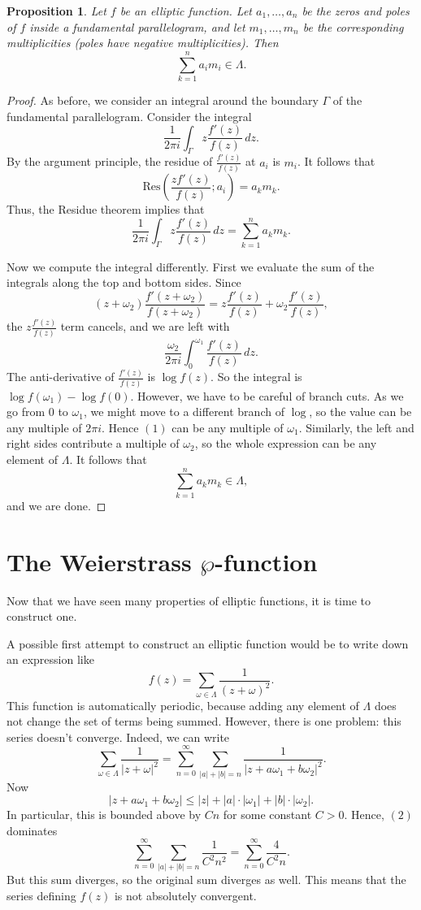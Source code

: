 \documentclass[12pt,reqno]{amsart}
\theoremstyle{plain}
\newtheorem{prop}[thm]{Proposition}
\numberwithin{equation}{section}
\begin{document}
\begin{prop}\label{prop: sum of roots}
Let $f$ be an elliptic function. Let $a_1,\dots, a_n$ be the zeros and poles of $f$ inside a fundamental parallelogram, and let $m_1,\dots, m_n$ be the corresponding multiplicities (poles have negative multiplicities). Then
\[\sum_{k=1}^n a_im_i \in \Lambda.\]
\end{prop}
\begin{proof}
    As before, we consider an integral around the boundary $\Gamma$ of the fundamental parallelogram. Consider the integral
\[\frac{1}{2\pi i}\int_\Gamma z\frac{f'(z)}{f(z)}\, dz.\]
By the argument principle, the residue of $\frac{f'(z)}{f(z)}$ at $a_i$ is $m_i$. It follows that \[\mathrm{Res}\left(\frac{zf'(z)}{f(z)}; a_i\right)=a_km_k.\] Thus, the Residue theorem implies that \[\frac{1}{2\pi i}\int_\Gamma z\frac{f'(z)}{f(z)}\, dz = \sum_{k=1}^n a_km_k.\]

Now we compute the integral differently. First we evaluate the sum of the integrals along the top and bottom sides. Since
\[(z+\omega_2) \frac{f'(z+\omega_2)}{f(z+\omega_2)}= z\frac{f'(z)}{f(z)}+\omega_2\frac{f'(z)}{f(z)},\]
the $z\frac{f'(z)}{f(z)}$ term cancels, and we are left with
\[\frac{\omega_2}{2\pi i}\int_{0}^{\omega_1} \frac{f'(z)}{f(z)}\, dz.\tag{$1$}\]
The anti-derivative of $\frac{f'(z)}{f(z)}$ is $\log f(z)$. So the integral is $\log f(\omega_1) - \log f(0)$. However, we have to be careful of branch cuts. As we go from $0$ to $\omega_1$, we might move to a different branch of $\log$, so the value can be any multiple of $2 \pi i$. Hence $(1)$ can be any multiple of $\omega_1$. Similarly, the left and right sides contribute a multiple of $\omega_2$, so the whole expression can be any element of $\Lambda$. It follows that
\[\sum_{k=1}^n a_k m_k \in \Lambda,\]and we are done.
\end{proof}

\section{The Weierstrass $\wp$-function}
Now that we have seen many properties of elliptic functions, it is time to construct one.

A possible first attempt to construct an elliptic function would be to write down an expression like
\[f(z) = \sum_{\omega\in \Lambda} \frac{1}{(z+\omega)^2}.\]
This function is automatically periodic, because adding any element of $\Lambda$ does not change the set of terms being summed. However, there is one problem: this series doesn't converge. Indeed, we can write 
\[\sum_{\omega\in \Lambda} \frac{1}{|z+\omega|^2} = \sum_{n=0}^\infty \sum_{|a|+|b| = n} \frac{1}{|z + a\omega_1 + b\omega_2|^2}.\tag{$2$}\]
Now 
\[|z+a\omega_1 + b\omega_2| \le |z| + |a|\cdot |\omega_1| + |b| \cdot |\omega_2|.\]
In particular, this is bounded above by $Cn$ for some constant $C>0$. Hence, $(2)$ dominates
\[\sum_{n=0}^\infty \sum_{|a| + |b| = n}\frac{1}{C^2n^2} = \sum_{n=0}^\infty \frac{4}{C^2n}.\]
But this sum diverges, so the original sum diverges as well. This means that the series defining $f(z)$ is not absolutely convergent.
\end{document}
